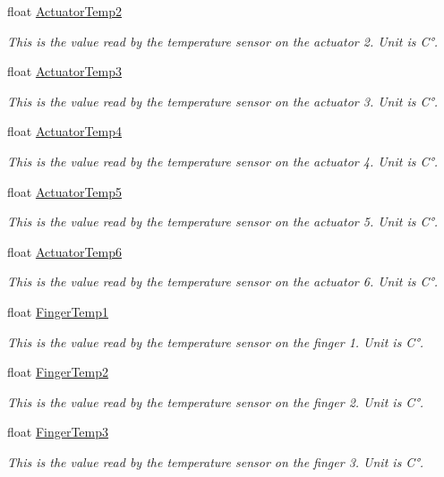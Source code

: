 \begin{DoxyCompactItemize}
float \hyperlink{struct_sensors_info_abf182850e94b2bab72a282eb2a76be75}{Actuator\+Temp2}
\begin{DoxyCompactList}\small\item\em This is the value read by the temperature sensor on the actuator 2. Unit is C°. \end{DoxyCompactList}\item 
float \hyperlink{struct_sensors_info_aae8cdcf3e2412f99ec5cdc5a13db1528}{Actuator\+Temp3}
\begin{DoxyCompactList}\small\item\em This is the value read by the temperature sensor on the actuator 3. Unit is C°. \end{DoxyCompactList}\item 
float \hyperlink{struct_sensors_info_a69bb9fe27b7e18a1c09da9135a13c324}{Actuator\+Temp4}
\begin{DoxyCompactList}\small\item\em This is the value read by the temperature sensor on the actuator 4. Unit is C°. \end{DoxyCompactList}\item 
float \hyperlink{struct_sensors_info_a03c089c08df66cc62b0aa768557e2128}{Actuator\+Temp5}
\begin{DoxyCompactList}\small\item\em This is the value read by the temperature sensor on the actuator 5. Unit is C°. \end{DoxyCompactList}\item 
float \hyperlink{struct_sensors_info_aa22bb78967dc3b480280c422613f8382}{Actuator\+Temp6}
\begin{DoxyCompactList}\small\item\em This is the value read by the temperature sensor on the actuator 6. Unit is C°. \end{DoxyCompactList}\item 
float \hyperlink{struct_sensors_info_a752833e7fba2c791ecf2693b96cff3d0}{Finger\+Temp1}
\begin{DoxyCompactList}\small\item\em This is the value read by the temperature sensor on the finger 1. Unit is C°. \end{DoxyCompactList}\item 
float \hyperlink{struct_sensors_info_a97f570d85f99948f785551712da25145}{Finger\+Temp2}
\begin{DoxyCompactList}\small\item\em This is the value read by the temperature sensor on the finger 2. Unit is C°. \end{DoxyCompactList}\item 
float \hyperlink{struct_sensors_info_ad18fa2c352189db0a8aff1d38c1c7b52}{Finger\+Temp3}
\begin{DoxyCompactList}\small\item\em This is the value read by the temperature sensor on the finger 3. Unit is C°. \end{DoxyCompactList}\end{DoxyCompactItemize}


